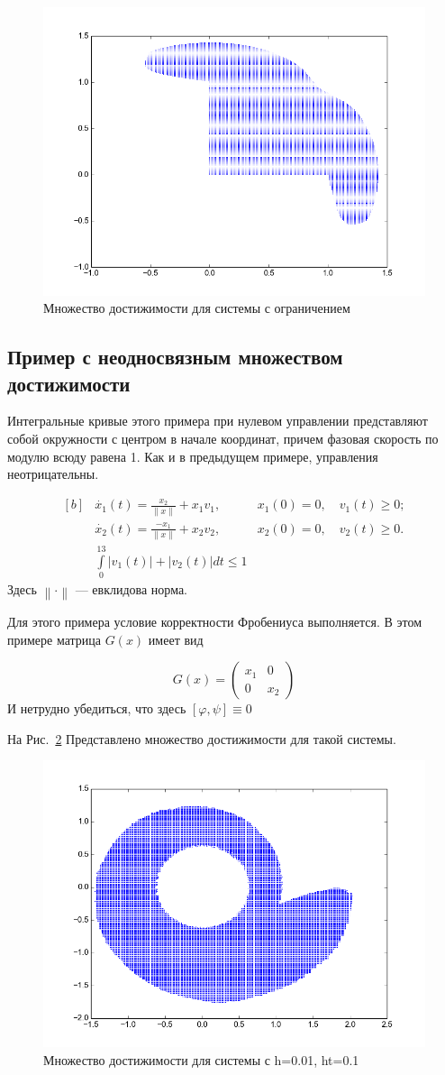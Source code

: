 \begin{figure}[h]
  \centering
  \noindent \hfil
  \includegraphics[width=0.5\linewidth]{img/figure_ndb_v7.png}
  \hfil \caption{Множество достижимости для системы с ограничением}
  \label{fig:vfb}
\end{figure}



\subsection{Пример с неодносвязным множеством достижимости}
\label{sec:swdnrs}


Интегральные кривые этого примера при нулевом управлении
представляют собой окружности с центром в начале координат, причем
фазовая скорость по модулю всюду равена 1. Как и в предыдущем примере,
управления неотрицательны.

\begin{equation*}
  \begin{aligned}[b]
    &\dot{x_1}(t) = \frac{x_2}{\left\|x\right\|} + x_1v_1, &x_1(0) =
    0,\quad v_1(t) \ge 0;\\
    &\dot{x_2}(t) = \frac{-x_1}{\left\|x\right\|} + x_2v_2, &x_2(0)
    = 0,\quad v_2(t) \ge 0.\\
    &\int\limits_0^{13} |v_1(t)| + |v_2(t)| dt \le 1
  \end{aligned}
\end{equation*}
Здесь $\left\| \cdot \right\|$ --- евклидова норма.

Для этого примера условие корректности
Фробениуса выполняется. 
В этом примере матрица $G(x)$ имеет вид 

\begin{equation*}
  G(x) = 
  \begin{pmatrix}
    x_1 & 0 \\
    0 & x_2
  \end{pmatrix}
\end{equation*}
И нетрудно убедиться, что здесь   $[\varphi,\psi] \equiv 0$

На Рис.~\ref{fig:v1h0.02} Представлено множество достижимости для
такой системы.


\begin{figure}[h]
  \centering
  \noindent \hfil
  \includegraphics[width=0.\linewidth]{img/figure_d_h_001_ht_01}
  \hfil \caption{Множество достижимости для системы с h=0.01, ht=0.1}
  \label{fig:v1h0.02}
\end{figure}


